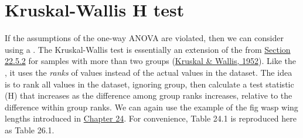 \documentclass[
  openany]{krantz}
\begin{document}
\hypertarget{Chapter_26}{%
\chapter{Kruskal-Wallis H test}\label{Chapter_26}}

If the assumptions of the one-way ANOVA are violated, then we can consider using a .
The Kruskal-Wallis test is essentially an extension of the  from \protect\hyperlink{mann-whitney-u-test}{Section 22.5.2} for samples with more than two groups (\protect\hyperlink{ref-Kruskal1952}{Kruskal \& Wallis, 1952}).
Like the , it uses the \emph{ranks} of values instead of the actual values in the dataset.
The idea is to rank all values in the dataset, ignoring group, then calculate a test statistic (H) that increases as the difference among group ranks increases, relative to the difference within group ranks.
We can again use the example of the fig wasp wing lengths introduced in \protect\hyperlink{Chapter_24}{Chapter 24}.
For convenience, Table 24.1 is reproduced here as Table 26.1.
\end{document}
